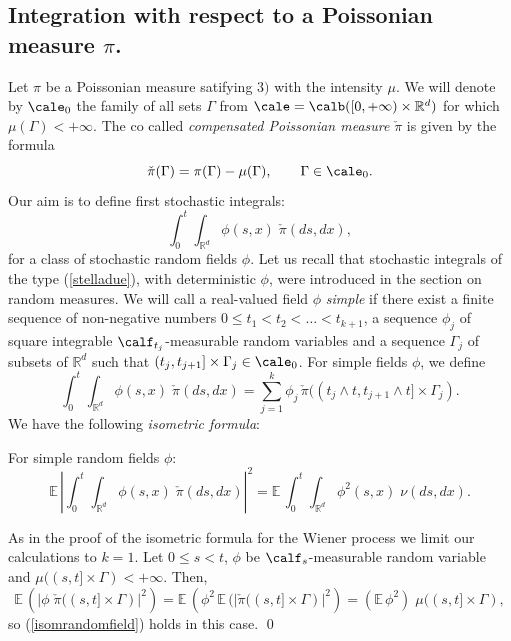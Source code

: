 \documentclass[preprint]{imsart}
\def\E{\mathbb E}
\def\R{\mathbb R}
\begin{document}
{\subsection{Integration  with respect to a Poissonian measure $\pi$.}

Let $\pi$ be a Poissonian measure satifying
$3)$ with the intensity $\mu$.
We will denote by $\cale_0$ the family of all sets $\Gamma$ from
$\cale=\calb ([0,+\infty)\times \R^d)$ for which
$\mu(\Gamma)<+\infty$. The co called {\em compensated Poissonian
measure} $\check{\pi} $ is given by the formula
$$
\check{\pi}(\Gamma)=\pi(\Gamma)-\mu(\Gamma),\qquad
\Gamma\in\cale_0.
$$
Our aim is to define first stochastic integrals:
\begin{equation}\label{stelladue}
  \int_0^t\int_{\R^d}\phi(s,x)\; \check{\pi}(ds,dx),
\end{equation}
for a class of stochastic random fields $\phi$. Let us recall that
stochastic integrals of the type (\ref{stelladue}), with
deterministic $\phi$, were introduced in the section on random
measures. We will call a real-valued field $\phi$ {\em simple}
if there exist a finite sequence of
non-negative numbers $0\le t_1<t_2<\ldots<t_{k+1}$, a sequence
$\phi_j$ of square integrable  $\calf_{t_j}$-measurable random
variables and a sequence $\Gamma_j$ of subsets of $\R^d$ such that
$(  t_j,t_{j+1}]\times \Gamma_j\in\cale_0$. For simple fields $\phi$, we
define
$$
 \int_0^t\int_{\R^d}\phi(s,x)\; \check{\pi}(ds,dx)=
\sum_{j=1}^k\phi_j\,
\check{\pi}((  t_j \wedge t, t_{j+1}\wedge t]\times \Gamma_j).
$$
We have the following {\em isometric formula}:


\begin{Proposition}
  For simple random fields $\phi$:
\begin{equation}\label{isomrandomfield}
  \E\,\left| \int_0^t\int_{\R^d}\phi(s,x)\; \check{\pi}(ds,dx)
  \right|^2
  =\E\,\int_0^t \int_{\R^d}\phi^2(s,x)\;\nu( ds,dx).
\end{equation}
\end{Proposition}

As in the proof of the isometric formula for the Wiener process we
limit our calculations to $k=1$.
Let $0\le s<t$, $\phi$ be $\calf_s$-measurable random variable  and
$\mu((  s,t]\times \Gamma)<+\infty$. Then,
$$
  \E\,\left(| \phi\; \check{\pi}((  s,t]\times \Gamma)|^2
  \right)
  = \E\,\left(\phi^2\, \E\,(  |\check{\pi}((  s,t]\times \Gamma)|^2 \right)
  =(\E\,\phi^2)\;\mu((  s,t]\times \Gamma),
  $$
so (\ref{isomrandomfield}) holds in this case.
\qed

}
\end{document}
